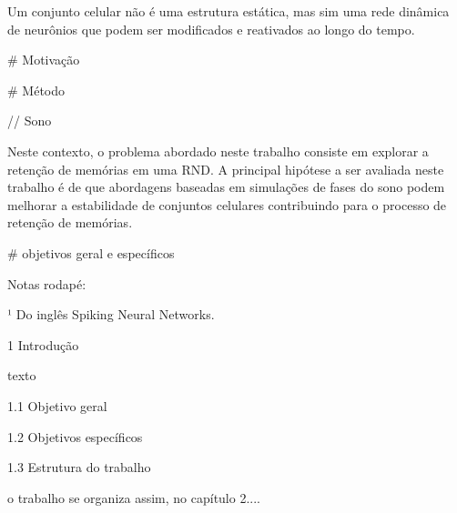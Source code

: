 Um conjunto celular não é uma estrutura estática, mas sim uma rede dinâmica de neurônios que podem ser modificados e reativados
ao longo do tempo.


# Motivação

# Método

// Sono

Neste contexto, o problema abordado neste trabalho consiste em explorar a retenção de memórias em uma RND. A principal hipótese a
ser avaliada neste trabalho é de que abordagens baseadas em simulações de fases do sono podem melhorar a estabilidade de conjuntos
celulares contribuindo para o processo de retenção de memórias.

# objetivos geral e específicos

Notas rodapé:

¹ Do inglês Spiking Neural Networks.


1 Introdução

texto

1.1 Objetivo geral

1.2 Objetivos específicos

1.3 Estrutura do trabalho

o trabalho se organiza assim, no capítulo 2....
